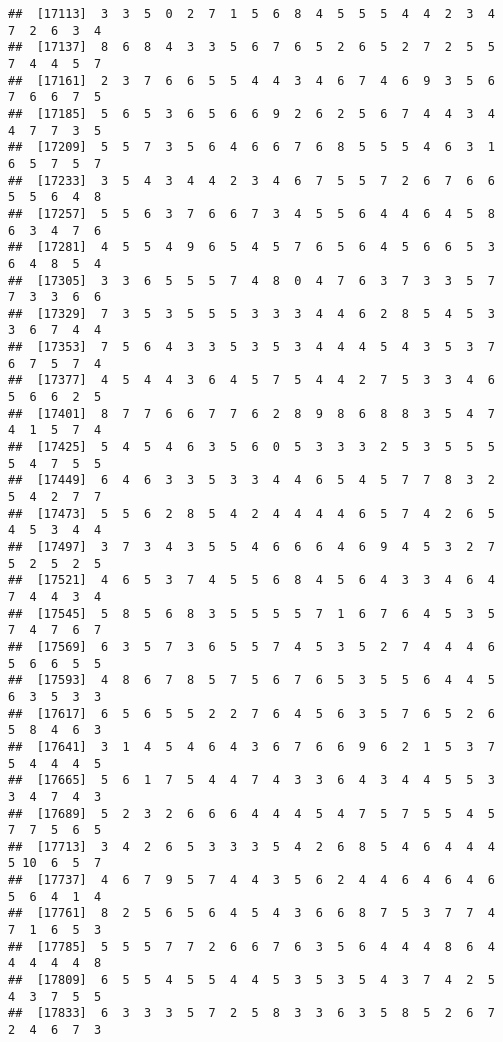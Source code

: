 \documentclass[
]{book}
\begin{document}
\begin{verbatim}
##  [17113]  3  3  5  0  2  7  1  5  6  8  4  5  5  5  4  4  2  3  4  7  2  6  3  4
##  [17137]  8  6  8  4  3  3  5  6  7  6  5  2  6  5  2  7  2  5  5  7  4  4  5  7
##  [17161]  2  3  7  6  6  5  5  4  4  3  4  6  7  4  6  9  3  5  6  7  6  6  7  5
##  [17185]  5  6  5  3  6  5  6  6  9  2  6  2  5  6  7  4  4  3  4  4  7  7  3  5
##  [17209]  5  5  7  3  5  6  4  6  6  7  6  8  5  5  5  4  6  3  1  6  5  7  5  7
##  [17233]  3  5  4  3  4  4  2  3  4  6  7  5  5  7  2  6  7  6  6  5  5  6  4  8
##  [17257]  5  5  6  3  7  6  6  7  3  4  5  5  6  4  4  6  4  5  8  6  3  4  7  6
##  [17281]  4  5  5  4  9  6  5  4  5  7  6  5  6  4  5  6  6  5  3  6  4  8  5  4
##  [17305]  3  3  6  5  5  5  7  4  8  0  4  7  6  3  7  3  3  5  7  7  3  3  6  6
##  [17329]  7  3  5  3  5  5  5  3  3  3  4  4  6  2  8  5  4  5  3  3  6  7  4  4
##  [17353]  7  5  6  4  3  3  5  3  5  3  4  4  4  5  4  3  5  3  7  6  7  5  7  4
##  [17377]  4  5  4  4  3  6  4  5  7  5  4  4  2  7  5  3  3  4  6  5  6  6  2  5
##  [17401]  8  7  7  6  6  7  7  6  2  8  9  8  6  8  8  3  5  4  7  4  1  5  7  4
##  [17425]  5  4  5  4  6  3  5  6  0  5  3  3  3  2  5  3  5  5  5  5  4  7  5  5
##  [17449]  6  4  6  3  3  5  3  3  4  4  6  5  4  5  7  7  8  3  2  5  4  2  7  7
##  [17473]  5  5  6  2  8  5  4  2  4  4  4  4  6  5  7  4  2  6  5  4  5  3  4  4
##  [17497]  3  7  3  4  3  5  5  4  6  6  6  4  6  9  4  5  3  2  7  5  2  5  2  5
##  [17521]  4  6  5  3  7  4  5  5  6  8  4  5  6  4  3  3  4  6  4  7  4  4  3  4
##  [17545]  5  8  5  6  8  3  5  5  5  5  7  1  6  7  6  4  5  3  5  7  4  7  6  7
##  [17569]  6  3  5  7  3  6  5  5  7  4  5  3  5  2  7  4  4  4  6  5  6  6  5  5
##  [17593]  4  8  6  7  8  5  7  5  6  7  6  5  3  5  5  6  4  4  5  6  3  5  3  3
##  [17617]  6  5  6  5  5  2  2  7  6  4  5  6  3  5  7  6  5  2  6  5  8  4  6  3
##  [17641]  3  1  4  5  4  6  4  3  6  7  6  6  9  6  2  1  5  3  7  5  4  4  4  5
##  [17665]  5  6  1  7  5  4  4  7  4  3  3  6  4  3  4  4  5  5  3  3  4  7  4  3
##  [17689]  5  2  3  2  6  6  6  4  4  4  5  4  7  5  7  5  5  4  5  7  7  5  6  5
##  [17713]  3  4  2  6  5  3  3  3  5  4  2  6  8  5  4  6  4  4  4  5 10  6  5  7
##  [17737]  4  6  7  9  5  7  4  4  3  5  6  2  4  4  6  4  6  4  6  5  6  4  1  4
##  [17761]  8  2  5  6  5  6  4  5  4  3  6  6  8  7  5  3  7  7  4  7  1  6  5  3
##  [17785]  5  5  5  7  7  2  6  6  7  6  3  5  6  4  4  4  8  6  4  4  4  4  4  8
##  [17809]  6  5  5  4  5  5  4  4  5  3  5  3  5  4  3  7  4  2  5  4  3  7  5  5
##  [17833]  6  3  3  3  5  7  2  5  8  3  3  6  3  5  8  5  2  6  7  2  4  6  7  3

\end{verbatim}
\end{document}
